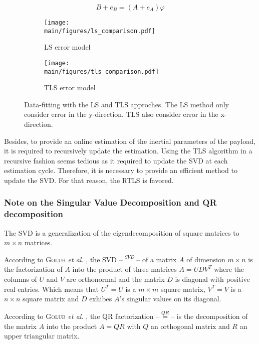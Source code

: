 \documentclass[/home/francois/latex/report/main.tex]{subfiles}
\begin{document}
\begin{equation}
  \label{eq:background:tls-error}
B + e_B = (A + e_A) \varphi
\end{equation}

\begin{figure}[h]
\centering
\begin{subfigure}{0.49\textwidth}
\centering
\texttt{[image: \\main/figures/ls\_comparison.pdf]}
\caption{\ac{LS} error model}
\label{fig:background:ls-error}
\end{subfigure}
\begin{subfigure}{0.49\textwidth}
\centering
\texttt{[image: \\main/figures/tls\_comparison.pdf]}
\caption{\ac{TLS} error model}
\label{fig:background:tls-error}
\end{subfigure}
\caption{Data-fitting with the \ac{LS} and \ac{TLS} approches. The \ac{LS} method only consider error in the y-direction. \ac{TLS} also consider error in the x-direction.}
\label{fig:background:ls-tls-error}
\end{figure}

Besides, to provide an online estimation of the inertial parameters of the payload, it is required to recursively update the estimation. Using the \ac{TLS} algorithm in a recursive fashion seems tedious as it required to update the \ac{SVD} at each estimation cycle. Therefore, it is necessary to provide an efficient method to update the \ac{SVD}. For that reason, the \ac{RTLS} is favored.

\subsubsection{Note on the Singular Value Decomposition and QR decomposition}

The \ac{SVD} is a generalization of the eigendecomposition of square matrices to $m \times n$ matrices.

According to \textsc{Golub} \textit{et al.} \cite{Golub1965}, the \ac{SVD} –$\overset{SVD}{=}$– of a matrix $A$ of dimension $m \times n$ is the factorization of $A$ into the product of three matrices $A = UDV^T$ where the columns of $U$ and $V$ are orthonormal and the matrix $D$ is diagonal with positive real entries. Which means that $U^T = U$ is a $m \times m$ square matrix, $V^T = V$ is a $n \times n$ square matrix and $D$ exhibes $A$'s singular values on its diagonal.

According to \textsc{Golub} \textit{et al.} \cite{Golub1996}, the QR factorization –$\overset{QR}{=}$– is the decomposition of the matrix $A$ into the product $A = QR$ with $Q$ an orthogonal matrix and $R$ an upper triangular matrix.
\end{document}
